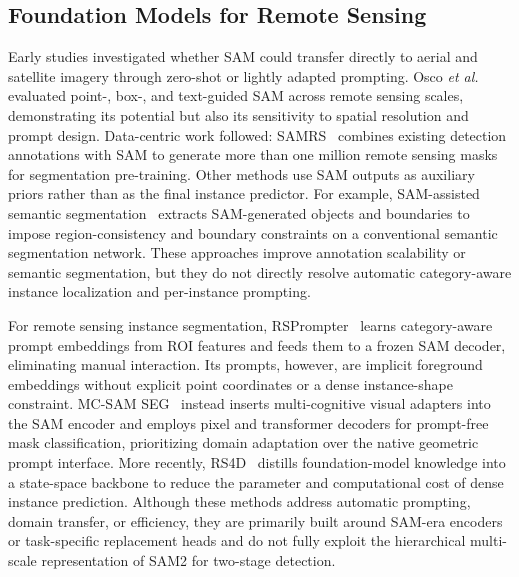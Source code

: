 \documentclass[letterpaper,journal]{IEEEtran}
\begin{document}
\subsection{Foundation Models for Remote Sensing}
Early studies investigated whether SAM could transfer directly to aerial and satellite imagery through zero-shot or lightly adapted prompting. Osco \textit{et al.}~\cite{ref_samrsapp} evaluated point-, box-, and text-guided SAM across remote sensing scales, demonstrating its potential but also its sensitivity to spatial resolution and prompt design. Data-centric work followed: SAMRS~\cite{ref_samrs} combines existing detection annotations with SAM to generate more than one million remote sensing masks for segmentation pre-training. Other methods use SAM outputs as auxiliary priors rather than as the final instance predictor. For example, SAM-assisted semantic segmentation~\cite{ref_samassist} extracts SAM-generated objects and boundaries to impose region-consistency and boundary constraints on a conventional semantic segmentation network. These approaches improve annotation scalability or semantic segmentation, but they do not directly resolve automatic category-aware instance localization and per-instance prompting.

For remote sensing instance segmentation, RSPrompter~\cite{ref_rsprompter} learns category-aware prompt embeddings from ROI features and feeds them to a frozen SAM decoder, eliminating manual interaction. Its prompts, however, are implicit foreground embeddings without explicit point coordinates or a dense instance-shape constraint. MC-SAM SEG~\cite{ref_mcsamseg} instead inserts multi-cognitive visual adapters into the SAM encoder and employs pixel and transformer decoders for prompt-free mask classification, prioritizing domain adaptation over the native geometric prompt interface. More recently, RS4D~\cite{ref_rs4d} distills foundation-model knowledge into a state-space backbone to reduce the parameter and computational cost of dense instance prediction. Although these methods address automatic prompting, domain transfer, or efficiency, they are primarily built around SAM-era encoders or task-specific replacement heads and do not fully exploit the hierarchical multi-scale representation of SAM2 for two-stage detection.
\end{document}
